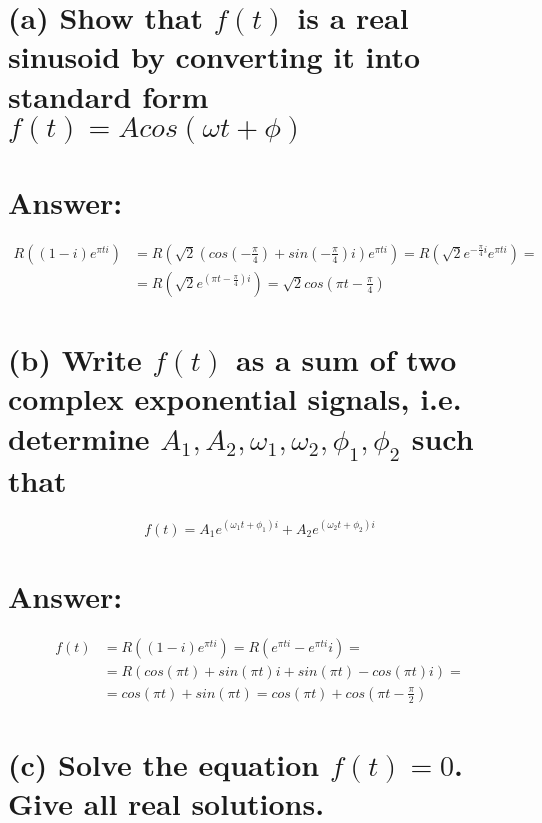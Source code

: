 \documentclass[15px]{article}
\begin{document}
\section*{\normalfont (a) Show that $f(t)$ is a real sinusoid by converting it into standard form $f(t) = Acos(\omega t + \phi)$}

\section*{Answer: }

\begin{equation}
\begin{split}
R((1 - i)e^{\pi ti}) & = R(\sqrt{2}(cos(-\frac{\pi}{4}) + sin(-\frac{\pi}{4})i) e^{\pi ti}) = R(\sqrt{2} e^{-\frac{\pi}{4}i} e^{\pi ti}) = \\ 
& = R(\sqrt{2} e^{(\pi t - \frac{\pi}{4})i}) = \sqrt{2}cos(\pi t - \frac{\pi}{4})
\end{split}
\end{equation}

\section*{\normalfont (b) Write $f(t)$ as a sum of two complex exponential signals, i.e. determine $A_1, A_2, \omega_1, \omega_2, \phi_1, \phi_2$
such that}

\begin{equation}
f(t) = A_1e^{(\omega_1t + \phi_1)i} + A_2e^{(\omega_2t + \phi_2)i}
\end{equation}

\section*{Answer: }

\begin{equation}
\begin{split}
f(t) & = R((1 - i)e^{\pi ti}) = R(e^{\pi ti} - e^{\pi ti}i) = \\
& = R(cos(\pi t) + sin(\pi t)i + sin(\pi t) - cos(\pi t)i) = \\
& = cos(\pi t) + sin(\pi t) = cos(\pi t) + cos(\pi t - \frac{\pi}{2})
\end{split}
\end{equation}

\section*{\normalfont (c) Solve the equation $f(t) = 0$. Give all real solutions.}
\end{document}

